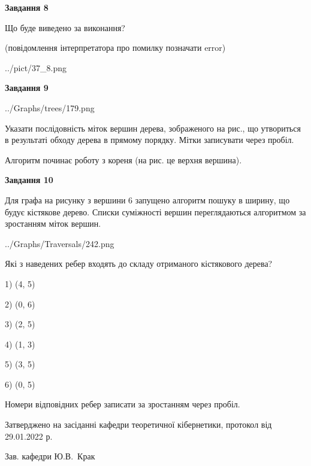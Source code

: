 \documentclass[12pt, ukrainian]{article}
\begin{document}
{\begin {large}
{\begin {center}\textbf{Завдання 8}\end {center}}\par
Що буде виведено за виконання?\par
 (повідомлення інтерпретатора про помилку позначати error)\par
\begin{center}
	{../pict/37_8.png}
\end{center}
\newpage

{\begin {center}\textbf{Завдання 9}\end {center}}\par

\begin{center}
	{../Graphs/trees/179.png}
\end{center}
Указати послідовність міток вершин дерева, зображеного на рис., що утвориться в результаті обходу дерева в прямому порядку. Мітки записувати через пробіл.\par Алгоритм починає роботу з кореня (на рис. це верхня вершина).\par
\newpage

{\begin {center}\textbf{Завдання 10}\end {center}}\par
Для графа на рисунку з вершини 6 запущено алгоритм пошуку в ширину, що будує кістякове дерево. Списки суміжності вершин переглядаються алгоритмом за зростанням міток вершин.\par
\begin{center}
	{../Graphs/Traversals/242.png}
\end{center}
\par Які з наведених ребер входять до складу отриманого кістякового дерева?\par
1) (4, 5)\par
2) (0, 6)\par
3) (2, 5)\par
4) (1, 3)\par
5) (3, 5)\par
6) (0, 5)\par
{\vskip 15pt} Номери відповідних ребер записати за зростанням через пробіл.\par
\newpage


\end {large}
}
{\smallskip \begin {small} Затверджено на засіданні кафедри теоретичної кібернетики, протокол  від   29.01.2022 р.\par\smallskip\smallskip
{\parbox {6.5 cm}{Зав. кафедри \dotfill Ю.В.~Крак}} \end{small}}
\end{document}
